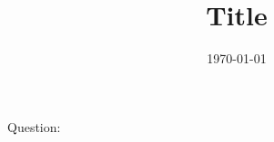 \documentclass[11pt,a4]{amsart}
\title{Title}
\date{\today}
\numberwithin{equation}{section} %
\begin{document}
\begin{enumerate}
 Question: %
    \begin{enumerate}
    \end{enumerate}
\end{enumerate}
\end{document}

